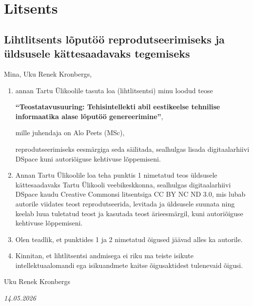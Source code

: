 \section*{Litsents} \label{litsents} 

\subsection*{Lihtlitsents lõputöö reprodutseerimiseks ja üldsusele kättesaadavaks tegemiseks}

Mina, Uku Renek Kronbergs,

\begin{enumerate}
    \item annan Tartu Ülikoolile tasuta loa (lihtlitsentsi) minu loodud teose

    \textbf{``Teostatavusuuring: Tehisintellekti abil eestikeelse tehnilise informaatika alase lõputöö genereerimine''},

    mille juhendaja on Alo Peets (MSc),

    reprodutseerimiseks eesmärgiga seda säilitada, sealhulgas lisada digitaalarhiivi DSpace kuni autoriõiguse kehtivuse lõppemiseni.

    \item Annan Tartu Ülikoolile loa teha punktis 1 nimetatud teos üldsusele kättesaadavaks Tartu Ülikooli veebikeskkonna, sealhulgas digitaalarhiivi DSpace kaudu Creative Commonsi litsentsiga CC BY NC ND 3.0, mis lubab autorile viidates teost reprodutseerida, levitada ja üldsusele suunata ning keelab luua tuletatud teost ja kasutada teost ärieesmärgil, kuni autoriõiguse kehtivuse lõppemiseni.

    \item Olen teadlik, et punktides 1 ja 2 nimetatud õigused jäävad alles ka autorile.

    \item Kinnitan, et lihtlitsentsi andmisega ei riku ma teiste isikute intellektuaalomandi ega isikuandmete kaitse õigusaktidest tulenevaid õigusi.
\end{enumerate}

\noindent Uku Renek Kronbergs

\noindent \textit{14.05.2026}
